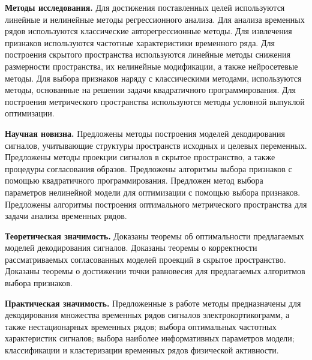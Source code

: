 \vspace{0.5cm}
\textbf{Методы исследования.}
Для достижения поставленных целей используются линейные и нелинейные методы регрессионного анализа.
Для анализа временных рядов используются классические авторегрессионные методы.
Для извлечения признаков используются частотные характеристики временного ряда.
Для построения скрытого пространства используются линейные методы снижения размерности пространства, их нелинейные модификации, а также нейросетевые методы.
Для выбора признаков наряду с классическими методами, используются методы, основанные на решении задачи квадратичного программирования.
Для построения метрического пространства используются методы условной выпуклой оптимизации.

\vspace{0.5cm}
\textbf{Научная новизна.}
Предложены методы построения моделей декодирования сигналов, учитывающие структуры пространств исходных и целевых переменных.
Предложены методы проекции сигналов в скрытое пространство, а также процедуры согласования образов.
Предложены алгоритмы выбора признаков с помощью квадратичного программирования.
Предложен метод выбора параметров нелинейной модели для оптимизации с помощью выбора признаков.
Предложены алгоритмы построения оптимального метрического пространства для задачи анализа временных рядов.

\vspace{0.5cm}
\textbf{Теоретическая значимость.}
Доказаны теоремы об оптимальности предлагаемых моделей декодирования сигналов.
Доказаны теоремы о корректности рассматриваемых согласованных моделей проекций в скрытое пространство.
Доказаны теоремы о достижении точки равновесия для предлагаемых алгоритмов выбора признаков. 

\vspace{0.5cm}
\textbf{Практическая значимость.}
Предложенные в работе методы предназначены для декодирования множества временных рядов сигналов электрокортикограмм, а также нестационарных временных рядов; выбора оптимальных частотных характеристик сигналов; выбора наиболее информативных параметров модели; классификации и кластеризации временных рядов физической активности.

